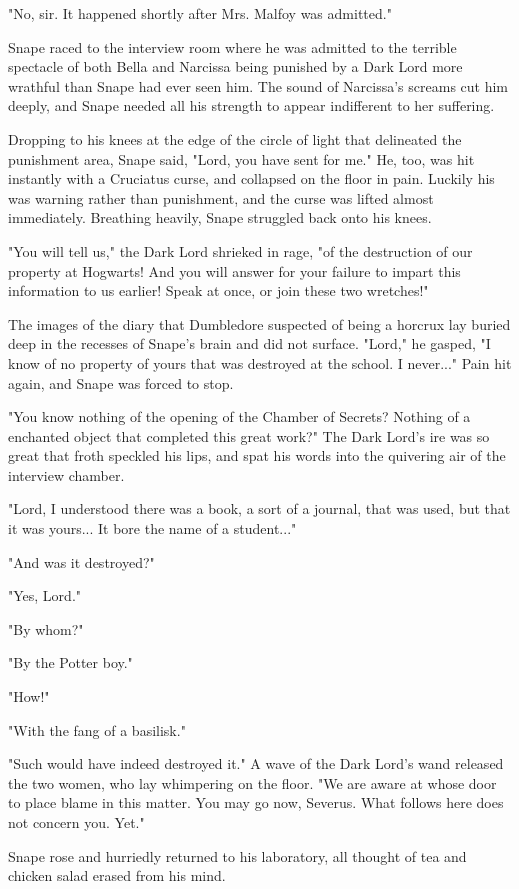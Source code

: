 \documentclass[a4paper,11pt]{article}
\begin{document}
"No, sir. It happened shortly after Mrs. Malfoy was admitted."

Snape raced to the interview room where he was admitted to the terrible spectacle of both Bella and Narcissa being punished by a Dark Lord more wrathful than Snape had ever seen him. The sound of Narcissa's screams cut him deeply, and Snape needed all his strength to appear indifferent to her suffering.

Dropping to his knees at the edge of the circle of light that delineated the punishment area, Snape said, "Lord, you have sent for me." He, too, was hit instantly with a Cruciatus curse, and collapsed on the floor in pain. Luckily his was warning rather than punishment, and the curse was lifted almost immediately. Breathing heavily, Snape struggled back onto his knees.

"You will tell us," the Dark Lord shrieked in rage, "of the destruction of our property at Hogwarts! And you will answer for your failure to impart this information to us earlier! Speak at once, or join these two wretches!"

The images of the diary that Dumbledore suspected of being a horcrux lay buried deep in the recesses of Snape's brain and did not surface. "Lord," he gasped, "I know of no property of yours that was destroyed at the school. I never..." Pain hit again, and Snape was forced to stop.

"You know nothing of the opening of the Chamber of Secrets? Nothing of a enchanted object that completed this great work?" The Dark Lord's ire was so great that froth speckled his lips, and spat his words into the quivering air of the interview chamber.

"Lord, I understood there was a book, a sort of a journal, that was used, but that it was yours... It bore the name of a student..."

"And was it destroyed?"

"Yes, Lord."

"By whom?"

"By the Potter boy."

"How!"

"With the fang of a basilisk."

"Such would have indeed destroyed it." A wave of the Dark Lord's wand released the two women, who lay whimpering on the floor. "We are aware at whose door to place blame in this matter. You may go now, Severus. What follows here does not concern you. Yet."

Snape rose and hurriedly returned to his laboratory, all thought of tea and chicken salad erased from his mind.
\end{document}

